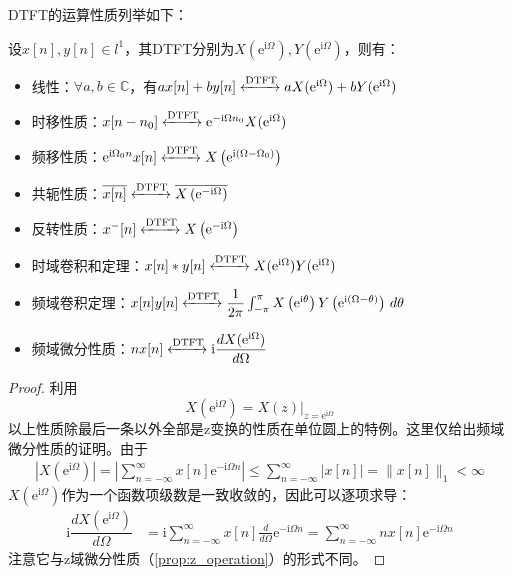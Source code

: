 DTFT的运算性质列举如下：
\begin{proposition}[离散时间傅里叶变换的运算性质]
    \label{prop:DTFT_operation}
    设$x[n],y[n]\in l^1$，其DTFT分别为$X(\mathrm{e}^{\mathrm{i}\Omega}),Y(\mathrm{e}^{\mathrm{i}\Omega})$，则有：\begin{itemize}
        \item  线性：$\forall a,b\in\mathbb{C}$，有$a x[n]+b y[n]\xleftrightarrow{\mathrm{DTFT}} a X(\mathrm{e}^{\mathrm{i}\Omega})+b Y(\mathrm{e}^{\mathrm{i}\Omega})$
        \item 时移性质：$x[n-n_0]\xleftrightarrow{\mathrm{DTFT}}\mathrm{e}^{-\mathrm{i}\Omega n_0}X(\mathrm{e}^{\mathrm{i}\Omega})$
        \item 频移性质：$\mathrm{e}^{\mathrm{i}\Omega_0 n}x[n]\xleftrightarrow{\mathrm{DTFT}}X\left(\mathrm{e}^{\mathrm{i}(\Omega-\Omega_0)}\right)$
        \item 共轭性质：$\overline{x[n]}\xleftrightarrow{\mathrm{DTFT}}\overline{X\left(\mathrm{e}^{-\mathrm{i}\Omega}\right)}$
        \item 反转性质：$x^-[n]\xleftrightarrow{\mathrm{DTFT}}X\left(\mathrm{e}^{-\mathrm{i}\Omega}\right)$
        \item 时域卷积和定理：$x[n]*y[n]\xleftrightarrow{\mathrm{DTFT}}X(\mathrm{e}^{\mathrm{i}\Omega})Y(\mathrm{e}^{\mathrm{i}\Omega})$
        \item 频域卷积定理：$x[n]y[n]\xleftrightarrow{\mathrm{DTFT}}\dfrac{1}{2\pi}\int_{-\pi}^{\pi}X\left(\mathrm{e}^{\mathrm{i}\theta}\right)Y\left(\mathrm{e}^{\mathrm{i}(\Omega-\theta)}\right)\,d\theta$
        \item 频域微分性质：$nx[n]\xleftrightarrow{\mathrm{DTFT}}\mathrm{i}\dfrac{dX(\mathrm{e}^{\mathrm{i}\Omega})}{d\Omega}$
    \end{itemize}
\end{proposition}
\begin{proof}
    利用\[X(\mathrm{e}^{\mathrm{i}\Omega})=X(z)|_{z=\mathrm{e}^{\mathrm{i}\Omega}}\]
    以上性质除最后一条以外全部是z变换的性质在单位圆上的特例。这里仅给出频域微分性质的证明。由于
    \begin{align*}
        \left|X(\mathrm{e}^{\mathrm{i}\Omega})\right|=\left|\sum_{n=-\infty}^{\infty}x[n]\mathrm{e}^{-\mathrm{i}\Omega n}\right|\leq \sum_{n=-\infty}^{\infty}|x[n]|=\|x[n]\|_1<\infty
    \end{align*}
    $X(\mathrm{e}^{\mathrm{i}\Omega})$作为一个函数项级数是一致收敛的，因此可以逐项求导：
    \begin{align*}
        \mathrm{i}\dfrac{dX(\mathrm{e}^{\mathrm{i}\Omega})}{d\Omega}&=\mathrm{i}\sum_{n=-\infty}^{\infty}x[n]\frac{d}{d\Omega}\mathrm{e}^{-\mathrm{i}\Omega n}=\sum_{n=-\infty}^{\infty}nx[n]\mathrm{e}^{-\mathrm{i}\Omega n}
    \end{align*}
    注意它与z域微分性质（\cref{prop:z_operation}）的形式不同。
\end{proof}

